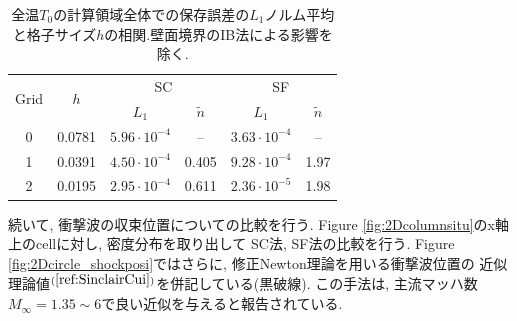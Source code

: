 \documentclass[a4j]{jarticle}
\begin{document}
\begin{table}[h]
  \centering
  \caption{全温$T_0$の計算領域全体での保存誤差の$L_1$ノルム平均と格子サイズ$h$の相関.壁面境界のIB法による影響を除く.}
  \begin{tabular}{cccccc}
    \toprule
    \multirow{2}{*}{Grid} & \multirow{2}{*}{$h$}
    & \multicolumn{2}{c}{SC} & \multicolumn{2}{c}{SF} \\
    \cmidrule(lr){3-4} \cmidrule(lr){5-6}
    & & $L_1$ & $\tilde{n}$ & $L_1$ & $\tilde{n}$ \\
    \midrule
    0 & 0.0781 & $5.96 \cdot 10^{-4}$ & –    & $3.63 \cdot 10^{-4}$ & – \\
    1 & 0.0391 & $4.50 \cdot 10^{-4}$ & 0.405 & $9.28 \cdot 10^{-4}$ & 1.97 \\
    2 & 0.0195 & $2.95 \cdot 10^{-4}$ & 0.611 & $2.36 \cdot 10^{-5}$ & 1.98 \\
    \bottomrule
  \end{tabular} 
  \label{tab:2D_circle_global_error_arranged}
\end{table}
続いて, 衝撃波の収束位置についての比較を行う.
Figure \ref{fig:2Dcolumnsitu}のx軸上のcellに対し, 密度分布を取り出して
SC法, SF法の比較を行う.
Figure \ref{fig:2Dcircle_shockposi}ではさらに, 修正Newton理論を用いる衝撃波位置の
近似理論値$^{(\ref{ref:SinclairCui})}$を併記している(黒破線). この手法は,
主流マッハ数$M_\infty = 1.35 \sim 6$で良い近似を与えると報告されている.
\end{document}
